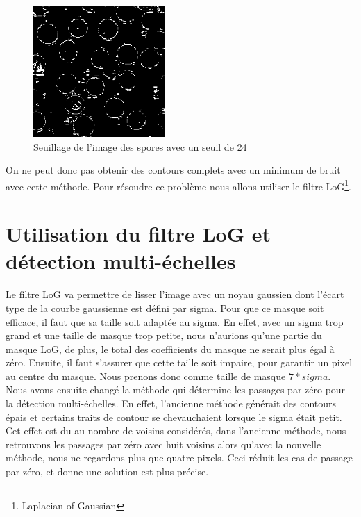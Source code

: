 \documentclass[a4paper,11pt]{article}
\begin{document}
  \begin{figure}[H]
   \center
   \includegraphics[width=5cm]{../seuillage24.png}
   \caption{Seuillage de l'image des spores avec un seuil de 24}
  \end{figure}
  
  On ne peut donc pas obtenir des contours complets avec un minimum de bruit avec cette méthode. Pour résoudre ce problème
  nous allons utiliser le filtre LoG\footnote{Laplacian of Gaussian}.
  
  \section{Utilisation du filtre LoG et détection multi-échelles}
  Le filtre LoG va permettre de lisser l'image avec un noyau gaussien dont l'écart type de la courbe gaussienne est défini par
  sigma. Pour que ce masque soit efficace, il faut que sa taille soit adaptée au sigma. En effet, avec un sigma trop grand et 
  une taille de masque trop petite, nous n'aurions qu'une partie du masque LoG, de plus, le total des coefficients du masque ne serait 
  plus égal à zéro. Ensuite, il faut s'assurer que cette taille soit impaire, pour garantir un pixel au centre du masque.
  Nous prenons donc comme taille de masque $7*sigma$.\\

  Nous avons ensuite changé la méthode qui détermine les passages par zéro pour la détection multi-échelles. En effet, 
  l'ancienne méthode générait des contours épais et certains traits de contour se chevauchaient lorsque le sigma était petit.
  Cet effet est du au nombre de voisins considérés, dans l'ancienne méthode, nous retrouvons les passages par zéro 
  avec huit voisins alors qu'avec la nouvelle méthode, nous ne regardons plus que quatre pixels. Ceci réduit les 
  cas de passage par zéro, et donne une solution est plus précise.\\
  
\end{document}
